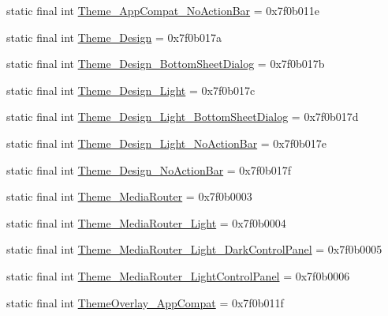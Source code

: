 \begin{CompactItemize}
\item 
static final int \hyperlink{classandroid_1_1support_1_1v7_1_1cardview_1_1_r_1_1style_27aeb447d2f3c3a467a501f06c304597}{Theme\_\-AppCompat\_\-NoActionBar} = 0x7f0b011e
\item 
static final int \hyperlink{classandroid_1_1support_1_1v7_1_1cardview_1_1_r_1_1style_37a5578ace96379c6ef64440523afd1c}{Theme\_\-Design} = 0x7f0b017a
\item 
static final int \hyperlink{classandroid_1_1support_1_1v7_1_1cardview_1_1_r_1_1style_d5e293b612450c7d781062ce7034b651}{Theme\_\-Design\_\-BottomSheetDialog} = 0x7f0b017b
\item 
static final int \hyperlink{classandroid_1_1support_1_1v7_1_1cardview_1_1_r_1_1style_7e068406743eb4098c79ea91971911e3}{Theme\_\-Design\_\-Light} = 0x7f0b017c
\item 
static final int \hyperlink{classandroid_1_1support_1_1v7_1_1cardview_1_1_r_1_1style_a6f6288b09697a4122d011db0a7dec2a}{Theme\_\-Design\_\-Light\_\-BottomSheetDialog} = 0x7f0b017d
\item 
static final int \hyperlink{classandroid_1_1support_1_1v7_1_1cardview_1_1_r_1_1style_ddb5efc5bd3f4b0b7e76ae45151dded0}{Theme\_\-Design\_\-Light\_\-NoActionBar} = 0x7f0b017e
\item 
static final int \hyperlink{classandroid_1_1support_1_1v7_1_1cardview_1_1_r_1_1style_d7d7f5a33b8f4df95c4d977c11dd69e7}{Theme\_\-Design\_\-NoActionBar} = 0x7f0b017f
\item 
static final int \hyperlink{classandroid_1_1support_1_1v7_1_1cardview_1_1_r_1_1style_9d1da586be43bb991bbdb0b6c770e85b}{Theme\_\-MediaRouter} = 0x7f0b0003
\item 
static final int \hyperlink{classandroid_1_1support_1_1v7_1_1cardview_1_1_r_1_1style_eda3f0abf74daecfb28e924282299a78}{Theme\_\-MediaRouter\_\-Light} = 0x7f0b0004
\item 
static final int \hyperlink{classandroid_1_1support_1_1v7_1_1cardview_1_1_r_1_1style_4a78006066f8efec0a75796a07756067}{Theme\_\-MediaRouter\_\-Light\_\-DarkControlPanel} = 0x7f0b0005
\item 
static final int \hyperlink{classandroid_1_1support_1_1v7_1_1cardview_1_1_r_1_1style_06de84f1e716a904067abbeca830c68e}{Theme\_\-MediaRouter\_\-LightControlPanel} = 0x7f0b0006
\item 
static final int \hyperlink{classandroid_1_1support_1_1v7_1_1cardview_1_1_r_1_1style_3a970246b6615c9f4bcb707cd1597edb}{ThemeOverlay\_\-AppCompat} = 0x7f0b011f
\item 

\end{CompactItemize}
